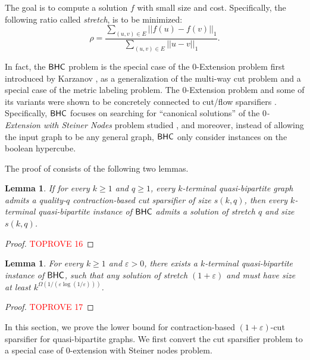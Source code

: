 \documentclass[11pt]{article}
\newtheorem{lemma}[theorem]{Lemma}
\theoremstyle{definition}
\newcommand{\eps}{{\varepsilon}}
\begin{document}
The goal is to compute a solution $f$ with small size and cost. Specifically, the following ratio called \emph{stretch}, is to be minimized:
\[\rho=\frac{\sum_{(u,v)\in E}||f(u)-f(v)||_1}{\sum_{(u,v)\in E}||u-v||_1}.\]

In fact, the $\textnormal{\textsf{BHC}}$ problem is the special case of the $0$-Extension problem first introduced by Karzanov \cite{karzanov1998minimum}, as a generalization of the multi-way cut problem and a special case of the metric labeling problem.
The $0$-Extension problem and some of its variants were shown to be concretely connected to cut/flow sparsifiers \cite{moitra2009approximation,leighton2010extensions,andoni2014towards,chen2024lower,chen20241+}. Specifically, $\textnormal{\textsf{BHC}}$ focuses on searching for ``canonical solutions'' of the \emph{$0$-Extension with Steiner Nodes} problem studied \cite{chen2024lower}, and moreover, instead of allowing the input graph to be any general graph, $\textnormal{\textsf{BHC}}$ only consider instances on the boolean hypercube.


The proof of  consists of the following two lemmas.

\begin{lemma}
If for every $k\ge 1$ and $q\ge 1$, every $k$-terminal quasi-bipartite graph admits a quality-$q$ contraction-based cut sparsifier of size $s(k,q)$, then every $k$-terminal quasi-bipartite instance of $\textnormal{\textsf{BHC}}$ admits a solution of stretch $q$ and size $s(k,q)$.
\end{lemma}

\begin{proof}\textcolor{red}{TOPROVE 16}\end{proof}

\begin{lemma}
For every $k\ge 1$ and $\eps>0$, there exists a $k$-terminal quasi-bipartite instance of $\textnormal{\textsf{BHC}}$, such that any solution of stretch $(1+\eps)$ and must have size at least $k^{\Omega(1/(\eps\log (1/\eps)))}$.
\end{lemma}

\begin{proof}\textcolor{red}{TOPROVE 17}\end{proof}







\iffalse

In this section, we prove the lower bound for contraction-based $(1+\eps)$-cut sparsifier for quasi-bipartite graphs. We first convert the cut sparsifier problem to a special case of $0$-extension with Steiner nodes problem.
\end{document}
